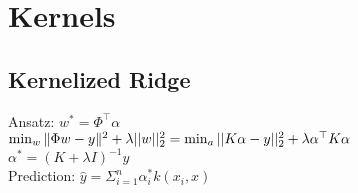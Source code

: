 \section*{Kernels}

\subsection*{Kernelized Ridge}
Ansatz: $w^*=\Phi^\top\alpha$\\
$\min_w\|\Phi w-y\|^2 + \lambda ||w||_2^2\\
=\min_a ||K\alpha -y||_2^2 + \lambda \alpha^\top K \alpha$\\
$\alpha^*=(K+\lambda I)^{-1} y$\\
Prediction: $\hat{y} = \Sigma_{i=1}^n \alpha_i^* k(x_i,x)$\\